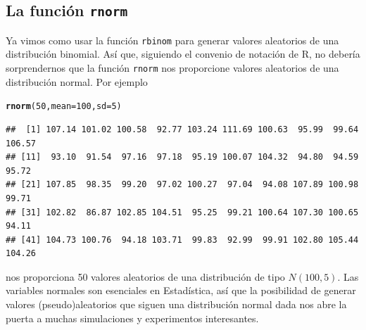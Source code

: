 \documentclass[10pt,a4paper]{article}\usepackage[]{graphicx}\usepackage[]{color}
\makeatletter
\newcommand{\hlnum}[1]{\textcolor[rgb]{0.686,0.059,0.569}{#1}}%
\newcommand{\hlstd}[1]{\textcolor[rgb]{0.345,0.345,0.345}{#1}}%
\newcommand{\hlkwc}[1]{\textcolor[rgb]{0.333,0.667,0.333}{#1}}%
\newcommand{\hlkwd}[1]{\textcolor[rgb]{0.737,0.353,0.396}{\textbf{#1}}}%
\newenvironment{kframe}{%
 \def\at@end@of@kframe{}%
 \ifinner\ifhmode%
  \def\at@end@of@kframe{\end{minipage}}%
  \begin{minipage}{\columnwidth}%
 \fi\fi%
 \def\FrameCommand##1{\hskip\@totalleftmargin \hskip-\fboxsep
 \colorbox{shadecolor}{##1}\hskip-\fboxsep
     \hskip-\linewidth \hskip-\@totalleftmargin \hskip\columnwidth}%
 \MakeFramed {\advance\hsize-\width
   \@totalleftmargin\z@ \linewidth\hsize
   \@setminipage}}%
 {\par\unskip\endMakeFramed%
 \at@end@of@kframe}
\newenvironment{knitrout}{}{} %
\makeatother
\begin{document}
\subsection{La función {\tt rnorm}}
\label{tut05:subsec:qnorm}

Ya vimos como usar la función {\tt rbinom} para generar valores aleatorios de una distribución binomial. Así que, siguiendo el convenio de notación de R, no debería sorprendernos que la función {\tt rnorm} nos proporcione valores aleatorios de una distribución normal. Por ejemplo
\begin{knitrout}
\color{fgcolor}\begin{kframe}
\begin{alltt}
    \hlkwd{rnorm}\hlstd{(}\hlnum{50}\hlstd{,}\hlkwc{mean}\hlstd{=}\hlnum{100}\hlstd{,}\hlkwc{sd}\hlstd{=}\hlnum{5}\hlstd{)}
\end{alltt}
\begin{verbatim}
##  [1] 107.14 101.02 100.58  92.77 103.24 111.69 100.63  95.99  99.64 106.57
## [11]  93.10  91.54  97.16  97.18  95.19 100.07 104.32  94.80  94.59  95.72
## [21] 107.85  98.35  99.20  97.02 100.27  97.04  94.08 107.89 100.98  99.71
## [31] 102.82  86.87 102.85 104.51  95.25  99.21 100.64 107.30 100.65  94.11
## [41] 104.73 100.76  94.18 103.71  99.83  92.99  99.91 102.80 105.44 104.26
\end{verbatim}
\end{kframe}
\end{knitrout}
nos proporciona 50 valores aleatorios de una distribución de tipo $N(100,5)$. Las variables normales son esenciales en Estadística, así que la posibilidad de generar valores (pseudo)aleatorios que siguen una distribución normal dada nos abre la puerta a muchas simulaciones y experimentos interesantes.
\end{document}
